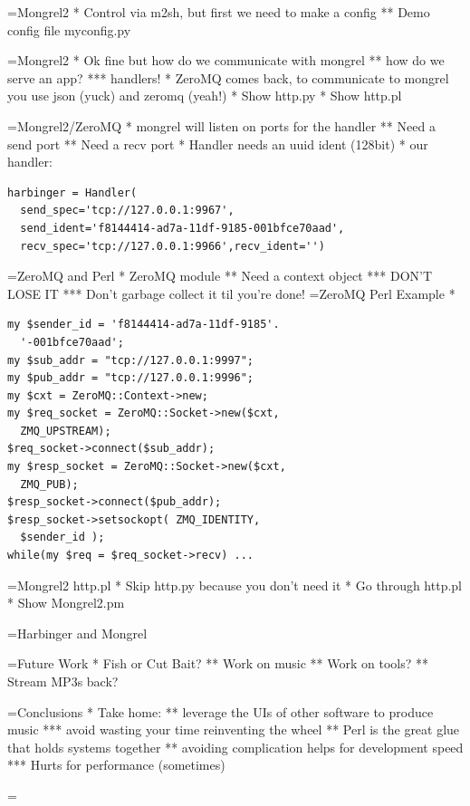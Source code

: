 \documentclass[titlepage,usenames,a4,landscape,semhelv]{seminar}
\begin{document}
\begin{slide}
=Mongrel2 
* Control via m2sh, but first we need to make a config
** Demo config file myconfig.py

=Mongrel2
* Ok fine but how do we communicate with mongrel
** how do we serve an app?
*** handlers!
* ZeroMQ comes back, to communicate to mongrel you use json (yuck) and
zeromq (yeah!)
* Show http.py 
* Show http.pl 

=Mongrel2/ZeroMQ
* mongrel will listen on ports for the handler
** Need a send port 
** Need a recv port
* Handler needs an uuid ident (128bit)
* our handler:
\begin{verbatim}
harbinger = Handler(
  send_spec='tcp://127.0.0.1:9967',
  send_ident='f8144414-ad7a-11df-9185-001bfce70aad',
  recv_spec='tcp://127.0.0.1:9966',recv_ident='')
\end{verbatim}

=ZeroMQ and Perl
* ZeroMQ module
** Need a context object 
*** DON'T LOSE IT
*** Don't garbage collect it til you're done!
=ZeroMQ Perl Example
* 
{\footnotesize
\begin{verbatim}
my $sender_id = 'f8144414-ad7a-11df-9185'. 
  '-001bfce70aad';
my $sub_addr = "tcp://127.0.0.1:9997";
my $pub_addr = "tcp://127.0.0.1:9996";
my $cxt = ZeroMQ::Context->new;
my $req_socket = ZeroMQ::Socket->new($cxt, 
  ZMQ_UPSTREAM);
$req_socket->connect($sub_addr);
my $resp_socket = ZeroMQ::Socket->new($cxt, 
  ZMQ_PUB);
$resp_socket->connect($pub_addr);
$resp_socket->setsockopt( ZMQ_IDENTITY, 
  $sender_id );
while(my $req = $req_socket->recv) ...
\end{verbatim}
}

=Mongrel2 http.pl
* Skip http.py because you don't need it
* Go through http.pl
* Show Mongrel2.pm

=Harbinger and Mongrel



=Future Work
* Fish or Cut Bait?
** Work on music
** Work on tools?
** Stream MP3s back?

=Conclusions
* Take home:
** leverage the UIs of other software to produce music
*** avoid wasting your time reinventing the wheel
** Perl is the great glue that holds systems together
** avoiding complication helps for development speed
*** Hurts for performance (sometimes)


=
\end{slide}
\end{document}
